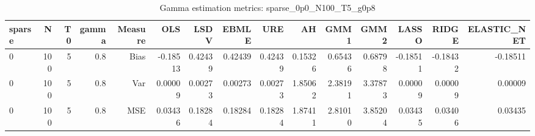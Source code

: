 \begin{table}[!htbp]\centering
\caption{Gamma estimation metrics: sparse_0p0_N100_T5_g0p8}
\label{tab:table1_sparse_0p0_N100_T5_g0p8}
\begin{tabular}{lrrrrrrrrrrrrrr}
\hline
sparse & N & T0 & gamma & Measure & OLS & LSDV & EBMLE & URE & AH & GMM1 & GMM2 & LASSO & RIDGE & ELASTIC_NET \\
\hline
0 & 100 & 5 & 0.8 & Bias & -0.18513 & 0.42439 & 0.42439 & 0.42439 & 0.15326 & 0.65436 & 0.68798 & -0.18511 & -0.18432 & -0.18511 \\
0 & 100 & 5 & 0.8 & Var & 0.00009 & 0.00273 & 0.00273 & 0.00273 & 1.85062 & 2.38191 & 3.37873 & 0.00009 & 0.00009 & 0.00009 \\
0 & 100 & 5 & 0.8 & MSE & 0.03436 & 0.18284 & 0.18284 & 0.18284 & 1.87411 & 2.81010 & 3.85204 & 0.03435 & 0.03406 & 0.03435 \\
\hline
\end{tabular}
\end{table}

